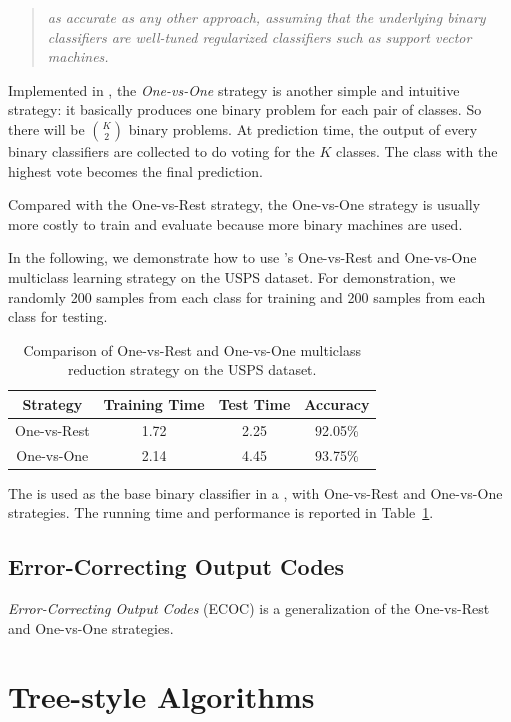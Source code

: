 \begin{quote}
	\emph{as accurate as any other approach, assuming that the underlying binary
classifiers are well-tuned regularized classifiers such as support vector
machines.}
\end{quote}

Implemented in , the 
\emph{One-vs-One} strategy \citep{OneVsOne} is another simple and intuitive 
strategy: it basically produces one binary problem for each pair of classes.  
So there will be $\binom{K}{2}$ binary problems. At prediction time, the 
output of every binary classifiers are collected to do voting for the $K$ 
classes. The class with the highest vote becomes the final prediction.

Compared with the One-vs-Rest strategy, the One-vs-One strategy is usually more
costly to train and evaluate because more binary machines are used.

In the following, we demonstrate how to use \shogun{}'s One-vs-Rest and 
One-vs-One multiclass learning strategy on the USPS dataset.  For 
demonstration, we randomly 200 samples from each class for training and 200 
samples from each class for testing.

\begin{table}\centering
	\begin{tabular}{cccc}
	\toprule
	Strategy & Training Time & Test Time & Accuracy \\
	\midrule
	One-vs-Rest & 1.72       & 2.25      & 92.05\%  \\
	One-vs-One  & 2.14       & 4.45      & 93.75\%  \\
	\bottomrule
	\end{tabular}
	\caption{Comparison of One-vs-Rest and One-vs-One multiclass reduction
		strategy on the USPS dataset.}
	\label{tab:ovr-vs-ovo}
\end{table}

The  is used as the base binary classifier in a
, with One-vs-Rest and One-vs-One
strategies. The running time and performance is reported in
Table~\ref{tab:ovr-vs-ovo}.

\subsection{Error-Correcting Output Codes}

\emph{Error-Correcting Output Codes} (ECOC) \citep{ECOC95,ECOCUnify} is a
generalization of the One-vs-Rest and One-vs-One strategies.

\section{Tree-style Algorithms}
\label{sec:multiclass-tree}
